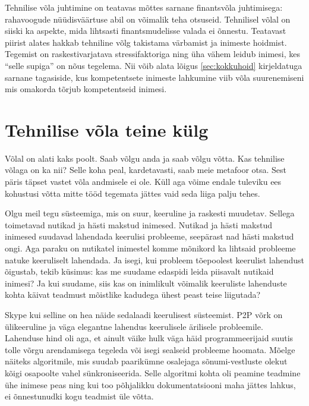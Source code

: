 \documentclass{tufte-book}
\begin{document}
Tehnilise võla juhtimine on teatavas mõttes sarnane finantsvõla juhtimisega: rahavoogude nüüdisväärtuse abil on võimalik teha otsuseid. Tehnilisel võlal on siiski ka aspekte, mida lihtsasti finantsmudelisse valada ei õnnestu. Teatavast piirist alates hakkab tehniline võlg takistama värbamist ja inimeste hoidmist. Tegemist on raskestivarjatava stressifaktoriga ning üha vähem leidub inimesi, kes \enquote{selle supiga} on nõus tegelema. Nii võib alata lõigus \ref{sec:kokkuhoid} kirjeldatuga sarnane tagasiside, kus kompetentsete inimeste lahkumine viib võla suurenemiseni mis omakorda tõrjub kompetentseid inimesi. 

\section{Tehnilise võla teine külg}
Võlal on alati kaks poolt. Saab võlgu anda ja saab võlgu võtta. Kas tehnilise võlaga on ka nii? Selle koha peal, kardetavasti, saab meie metafoor otsa. Sest päris täpset vastet võla andmisele ei ole. Küll aga võime endale tuleviku ees kohustusi võtta mitte tööd tegemata jättes vaid seda liiga palju tehes. 

Olgu meil tegu süsteemiga, mis on suur, keeruline ja raskesti muudetav. Sellega toimetavad nutikad ja hästi makstud inimesed. Nutikad ja hästi makstud inimesed suudavad lahendada keerulisi probleeme, seepärast nad hästi makstud ongi. Aga paraku on nutikatel inimestel komme mõnikord ka lihtsaid probleeme natuke keeruliselt lahendada. Ja isegi, kui probleem tõepoolest keerulist lahendust õigustab, tekib küsimus: kas me suudame edaspidi leida piisavalt nutikaid inimesi? Ja kui suudame, siis kas on inimlikult võimalik keeruliste lahenduste kohta käivat teadmust mõistlike kadudega ühest peast teise liigutada? 

Skype kui selline on hea näide sedalaadi keerulisest süsteemist. P2P võrk on ülikeeruline ja väga elegantne lahendus keerulisele ärilisele probleemile. Lahenduse hind oli aga, et ainult väike hulk väga häid programmeerijaid suutis tolle võrgu arendamisega tegeleda või isegi sealseid probleeme hoomata. Mõelge näiteks algoritmile, mis suudab paarikümne osalejaga sõnumi-vestluste olekut kõigi osapoolte vahel sünkroniseerida. Selle algoritmi kohta oli peamine teadmine ühe inimese peas ning kui too põhjalikku dokumentatsiooni maha jättes lahkus, ei õnnestunudki kogu teadmist üle võtta.
\end{document}
